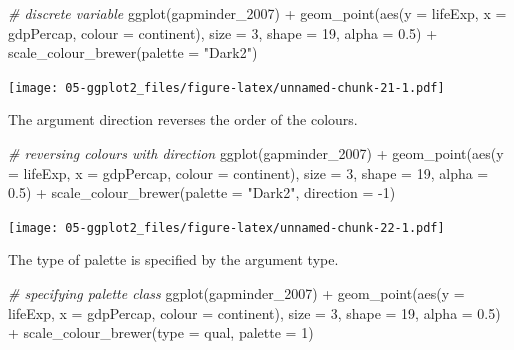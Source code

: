 \documentclass[
]{book}
\newenvironment{Shaded}{\begin{snugshade}}{\end{snugshade}}
\newcommand{\AttributeTok}[1]{\textcolor[rgb]{0.77,0.63,0.00}{#1}}
\newcommand{\CommentTok}[1]{\textcolor[rgb]{0.56,0.35,0.01}{\textit{#1}}}
\newcommand{\DecValTok}[1]{\textcolor[rgb]{0.00,0.00,0.81}{#1}}
\newcommand{\FloatTok}[1]{\textcolor[rgb]{0.00,0.00,0.81}{#1}}
\newcommand{\FunctionTok}[1]{\textcolor[rgb]{0.00,0.00,0.00}{#1}}
\newcommand{\NormalTok}[1]{#1}
\newcommand{\SpecialCharTok}[1]{\textcolor[rgb]{0.00,0.00,0.00}{#1}}
\newcommand{\StringTok}[1]{\textcolor[rgb]{0.31,0.60,0.02}{#1}}
\begin{document}
\begin{Shaded}
\begin{Highlighting}[]
\CommentTok{\# discrete variable}
\FunctionTok{ggplot}\NormalTok{(gapminder\_2007) }\SpecialCharTok{+} 
  \FunctionTok{geom\_point}\NormalTok{(}\FunctionTok{aes}\NormalTok{(}\AttributeTok{y =}\NormalTok{ lifeExp, }\AttributeTok{x =}\NormalTok{ gdpPercap, }\AttributeTok{colour =}\NormalTok{ continent), }\AttributeTok{size =} \DecValTok{3}\NormalTok{, }\AttributeTok{shape =} \DecValTok{19}\NormalTok{, }
             \AttributeTok{alpha =} \FloatTok{0.5}\NormalTok{) }\SpecialCharTok{+}
  \FunctionTok{scale\_colour\_brewer}\NormalTok{(}\AttributeTok{palette =} \StringTok{"Dark2"}\NormalTok{)}
\end{Highlighting}
\end{Shaded}

\texttt{[image: 05-ggplot2\_files/figure-latex/unnamed-chunk-21-1.pdf]}

The argument direction reverses the order of the colours.

\begin{Shaded}
\begin{Highlighting}[]
\CommentTok{\# reversing colours with direction}
\FunctionTok{ggplot}\NormalTok{(gapminder\_2007) }\SpecialCharTok{+} 
  \FunctionTok{geom\_point}\NormalTok{(}\FunctionTok{aes}\NormalTok{(}\AttributeTok{y =}\NormalTok{ lifeExp, }\AttributeTok{x =}\NormalTok{ gdpPercap, }\AttributeTok{colour =}\NormalTok{ continent), }\AttributeTok{size =} \DecValTok{3}\NormalTok{, }\AttributeTok{shape =} \DecValTok{19}\NormalTok{, }
             \AttributeTok{alpha =} \FloatTok{0.5}\NormalTok{) }\SpecialCharTok{+}
  \FunctionTok{scale\_colour\_brewer}\NormalTok{(}\AttributeTok{palette =} \StringTok{"Dark2"}\NormalTok{, }\AttributeTok{direction =} \SpecialCharTok{{-}}\DecValTok{1}\NormalTok{)}
\end{Highlighting}
\end{Shaded}

\texttt{[image: 05-ggplot2\_files/figure-latex/unnamed-chunk-22-1.pdf]}

The type of palette is specified by the argument type.

\begin{Shaded}
\begin{Highlighting}[]
\CommentTok{\# specifying palette class}
\FunctionTok{ggplot}\NormalTok{(gapminder\_2007) }\SpecialCharTok{+} 
  \FunctionTok{geom\_point}\NormalTok{(}\FunctionTok{aes}\NormalTok{(}\AttributeTok{y =}\NormalTok{ lifeExp, }\AttributeTok{x =}\NormalTok{ gdpPercap, }\AttributeTok{colour =}\NormalTok{ continent), }\AttributeTok{size =} \DecValTok{3}\NormalTok{, }\AttributeTok{shape =} \DecValTok{19}\NormalTok{, }
             \AttributeTok{alpha =} \FloatTok{0.5}\NormalTok{) }\SpecialCharTok{+}
  \FunctionTok{scale\_colour\_brewer}\NormalTok{(}\AttributeTok{type =} \StringTok{\textquotesingle{}qual\textquotesingle{}}\NormalTok{, }\AttributeTok{palette =} \DecValTok{1}\NormalTok{)}
\end{Highlighting}
\end{Shaded}
\end{document}
